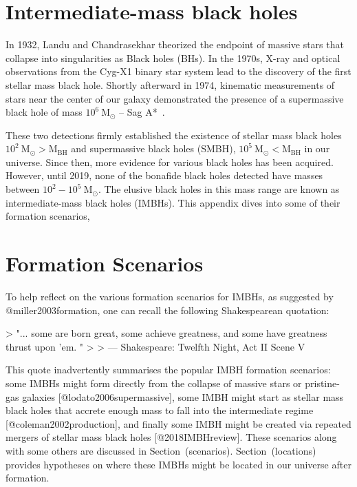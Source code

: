 \section{Intermediate-mass black holes}

In 1932, Landu and Chandrasekhar theorized the endpoint of massive
stars that collapse into singularities as Black holes (BHs). 
In the 1970s, X-ray and optical observations from the Cyg-X1 binary star system
lead to the discovery of the first stellar mass black hole. Shortly
afterward in 1974, kinematic measurements of stars near the center of
our galaxy demonstrated the presence of a supermassive black hole of mass
$10^6\ \text{M}_{\odot}$ -- Sag A*~\cite{sagA}.

These two detections firmly established the existence of stellar mass
black holes $10^{2} \ \text{M}_{\odot} > \text{M}_\text{BH}$ and
supermassive black holes (SMBH), $10^{5} \ \text{M}_{\odot} <
\text{M}_\text{BH}$ in our universe. Since then, more evidence for
various black holes has been acquired. 
However, until 2019, none of the bonafide black holes detected have masses between $10^{2} - 10^{5}\ \text{M}_{\odot}$. 
The elusive black holes in this mass range are known as intermediate-mass black holes (IMBHs).
This appendix dives into some of their formation scenarios, 


\section{Formation Scenarios}

To help reflect on the various formation scenarios for IMBHs,  
as suggested by @miller2003formation,
one can recall the following Shakespearean quotation:

> "... some are born great, some achieve greatness, and some have greatness thrust upon 'em. "
>
> --- Shakespeare:  Twelfth Night, Act II Scene V

This quote inadvertently summarises the popular IMBH formation
scenarios: some IMBHs might form directly from the collapse of massive
stars or pristine-gas galaxies [@lodato2006supermassive], some IMBH
might start as stellar mass black holes that accrete enough mass to fall
into the intermediate regime [@coleman2002production], and finally some
IMBH might be created via repeated mergers of stellar mass black holes
[@2018IMBHreview]. These scenarios along with some others are discussed
in Section~\@ref(scenarios). Section~\@ref(locations) provides
hypotheses on where these IMBHs might be located in our universe after
formation.

